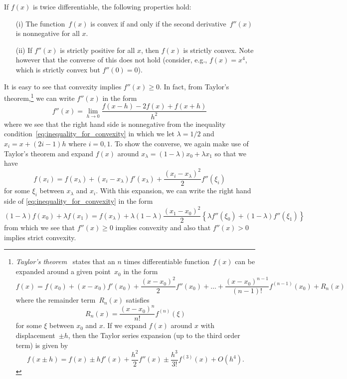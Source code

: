 \documentclass[12pt,a4paper]{article}
\begin{document}
If $f(x)$ is twice differentiable, the following properties hold:
\begin{itemize}
\item[(i)]
The function~$f(x)$ is convex if and only if the second derivative~$f''(x)$ is nonnegative
for all $x$.
\item[(ii)]
If $f''(x)$ is strictly positive for all $x$, then $f(x)$ is strictly convex.
Note however that the converse of this does not hold (consider, e.g., $f(x) = x^4$,
which is strictly convex but $f''(0) = 0$).
\end{itemize}
It is easy to see that convexity implies $f''(x) \geqslant 0$.
In fact, from Taylor's theorem,\footnote{%
\emph{Taylor's theorem}~\citep{AS:Handbook} states that
an $n$ times differentiable function~$f(x)$
can be expanded around a given point~$x_0$ in the form
\begin{equation}
f(x) = f(x_0) + (x - x_0) f'(x_0) +\frac{(x - x_0)^2}{2} f''(x_0) + \dots +
\frac{(x - x_0)^{n - 1}}{(n - 1)!} f^{(n - 1)}(x_0) + R_n(x)
\end{equation}
where the remainder term~$R_n(x)$ satisfies
\begin{equation}
R_n(x) = \frac{(x - x_0)^{n}}{n!} f^{(n)}(\xi)
\end{equation}
for some $\xi$ between $x_0$ and $x$.
If we expand $f(x)$ around $x$ with displacement~$\pm h$,
then the Taylor series expansion (up to the third order term) is given by
\begin{equation}
f(x \pm h) =
f(x) \pm h f'(x) + \frac{h^2}{2} f''(x) \pm \frac{h^3}{3!} f^{(3)}(x) + O\left(h^4\right) .
\end{equation}
}
we can write $f''(x)$ in the form
\begin{equation}
f''(x) = \lim_{h \to 0} \frac{f(x - h) - 2 f(x) + f(x + h)}{h^2}
\end{equation}
where we see that the right hand side is nonnegative
from the inequality condition~\eqref{eq:inequality_for_convexity}
in which we let $\lambda = 1/2$ and $x_i = x + (2i - 1) h$ where $i = 0, 1$.
To show the converse,
we again make use of Taylor's theorem and
expand $f(x)$ around $x_{\lambda} = (1 - \lambda) x_0 + \lambda x_1$
so that we have
\begin{equation}
f(x_i) = f(x_{\lambda}) + (x_i - x_{\lambda}) f' (x_{\lambda})
+ \frac{(x_i - x_{\lambda})^2}{2} f''(\xi_i)
\end{equation}
for some $\xi_i$ between $x_{\lambda}$ and $x_i$.
With this expansion,
we can write the right hand side of \eqref{eq:inequality_for_convexity} in the form
\begin{equation}
(1 - \lambda) f(x_0) + \lambda f(x_1)
= f(x_{\lambda})
+ \lambda (1 - \lambda) \frac{(x_1 - x_0)^2}{2}
\left\{
\lambda f''(\xi_0) + (1 - \lambda) f''(\xi_1)
\right\}
\end{equation}
from which we see that $f''(x) \geqslant 0$ implies convexity
and also that $f''(x) > 0$ implies strict convexity.
\end{document}
